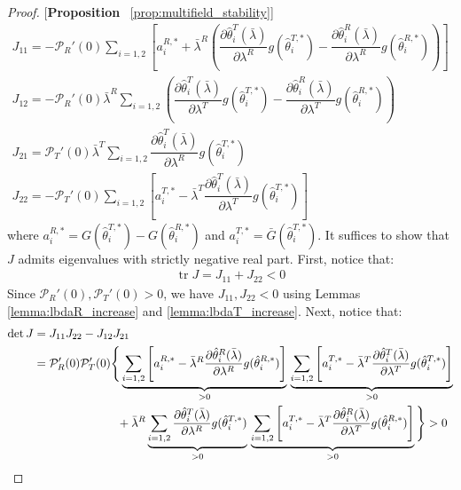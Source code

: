\begin{proof}{[\textbf{Proposition} ~\ref{prop:multifield_stability}]}
\begin{gather*}
  J_{11} = -\mathcal{P}_R'(0)\sum_{i=1,2}\left[a_i^{R,*} + \bar{\lambda}^R\left(\dfrac{\partial \hat{\theta}_i^T(\bar{\lambda})}{\partial \lambda^R}g(\hat{\theta}_i^{T,*}) - \dfrac{\partial \hat{\theta}^R_i(\bar{\lambda})}{\partial \lambda^R}g(\hat{\theta}^{R,*}_i)\right)\right] \\ 
  J_{12} = -\mathcal{P}_R'(0)\bar{\lambda}^R\sum_{i=1,2}\left(\dfrac{\partial \hat{\theta}_i^T(\bar{\lambda})}{\partial \lambda^T}g(\hat{\theta}_i^{T,*}) - \dfrac{\partial \hat{\theta}^R_i(\bar{\lambda})}{\partial \lambda^T}g(\hat{\theta}^{R,*}_i)\right)\\ 
  J_{21} = \mathcal{P}_T'(0)\bar{\lambda}^T\sum_{i=1,2}\dfrac{\partial \hat{\theta}_i^T(\bar{\lambda}) }{\partial \lambda^R}g(\hat{\theta}^{T,*}_i) \\ 
  J_{22} = -\mathcal{P}_T'(0)\sum_{i=1,2}\left[a_i^{T,*} - \bar{\lambda}^T\dfrac{\partial \hat{\theta}_i^T(\bar{\lambda})}{\partial \lambda^T}g(\hat{\theta}_i^{T,*})\right]
\end{gather*}
where $a_i^{R,*} = G(\hat{\theta}^{T,*}_i) - G(\hat{\theta}^{R,*}_i)$ and $a_i^{T,*} = \bar{G}(\hat{\theta}^{T,*}_i)$. It suffices to show that $J$ admits eigenvalues with strictly negative real part. First, notice that:
\begin{align*}
  \operatorname{tr} J = J_{11} + J_{22}<0
\end{align*}
Since $\mathcal{P}_R'(0),\mathcal{P}_T'(0)>0$, we have $J_{11},J_{22}<0$ using Lemmas \ref{lemma:lbdaR_increase} and \ref{lemma:lbdaT_increase}. Next, notice that:
\begin{align*}
  \operatorname{det} J &= J_{11}J_{22} - J_{12}J_{21} \\
  &= \mathcal{P}_R'(0)\mathcal{P}_T'(0)\Bigg\{\underbrace{\sum_{i=1,2}\left[a_i^{R,*} - \bar{\lambda}^R\dfrac{\partial \hat{\theta}^R_i(\bar{\lambda})}{\partial \lambda^R}g(\hat{\theta}^{R,*}_i)\right]}_{>0}\,\underbrace{\sum_{i=1,2}\left[a_i^{T,*} - \bar{\lambda}^T\dfrac{\partial \hat{\theta}_i^T(\bar{\lambda})}{\partial \lambda^T}g(\hat{\theta}_i^{T,*})\right]}_{>0} \\
  &\hphantom{= \mathcal{P}_R'(0)\mathcal{P}_T'(0)\Bigg\{} + \bar{\lambda}^R\underbrace{\sum_{i=1,2}\dfrac{\partial \hat{\theta}_i^T(\bar{\lambda})}{\partial \lambda^R}g(\hat{\theta}^{T,*}_i)}_{>0}\,\underbrace{\sum_{i=1,2}\left[a_i^{T,*} - \bar{\lambda}^T\dfrac{\partial \hat{\theta}^R_i(\bar{\lambda})}{\partial \lambda^T}g(\hat{\theta}^{R,*}_i)\right]}_{>0}\Bigg\} > 0
\end{align*}

\end{proof}

